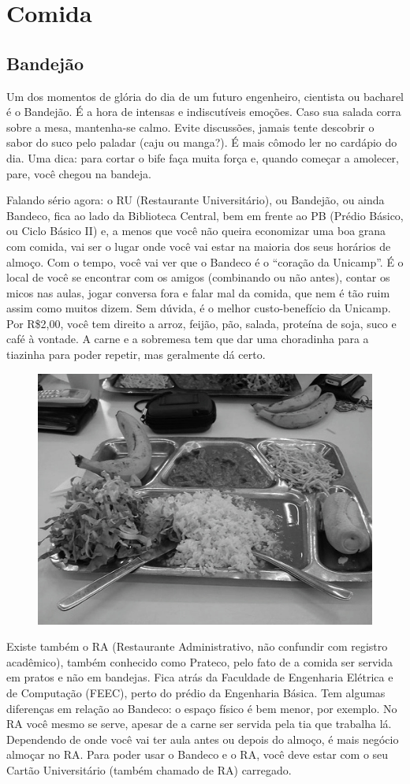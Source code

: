 
\section{Comida}
\subsection{Bandejão}

Um dos momentos de glória do dia de um futuro engenheiro, cientista ou bacharel
é o Bandejão. É a hora de intensas e indiscutíveis emoções. Caso sua salada
corra sobre a mesa, mantenha-se calmo. Evite discussões, jamais tente descobrir
o sabor do suco pelo paladar (caju ou manga?). É mais cômodo ler no cardápio do
dia. Uma dica: para cortar o bife faça muita força e, quando começar a amolecer,
pare, você chegou na bandeja.

Falando sério agora: o RU (Restaurante Universitário), ou Bandejão, ou ainda
Bandeco, fica ao lado da Biblioteca Central, bem em frente ao PB (Prédio Básico,
ou Ciclo Básico II) e, a menos que você não queira economizar uma boa grana com
comida, vai ser o lugar onde você vai estar na maioria dos seus horários de
almoço. Com o tempo, você vai ver que o Bandeco é o ``coração da Unicamp''. É o
local de você se encontrar com os amigos (combinando ou não antes), contar os
micos nas aulas, jogar conversa fora e falar mal da comida, que nem é tão ruim
assim como muitos dizem. Sem dúvida, é o melhor custo-benefício da Unicamp. Por
R\$2,00, você tem direito a arroz, feijão, pão, salada, proteína de soja, suco e
café à vontade. A carne e a sobremesa tem que dar uma choradinha para a tiazinha
para poder repetir, mas geralmente dá certo.

\begin{figure}[h!]
    \centering
    \includegraphics[width=.45\textwidth]{img/barao/bandeco.jpg}
\end{figure}

Existe também o RA (Restaurante Administrativo, não confundir com registro
acadêmico), também conhecido como Prateco, pelo fato de a comida ser servida em
pratos e não em bandejas. Fica atrás da Faculdade de Engenharia Elétrica e de
Computação (FEEC), perto do prédio da Engenharia Básica. Tem algumas diferenças
em relação ao Bandeco: o espaço físico é bem menor, por exemplo. No RA você
mesmo se serve, apesar de a carne ser servida pela tia que trabalha
lá. Dependendo de onde você vai ter aula antes ou depois do almoço, é mais
negócio almoçar no RA. Para poder usar o Bandeco e o RA, você deve estar com o
seu Cartão Universitário (também chamado de RA) carregado.

